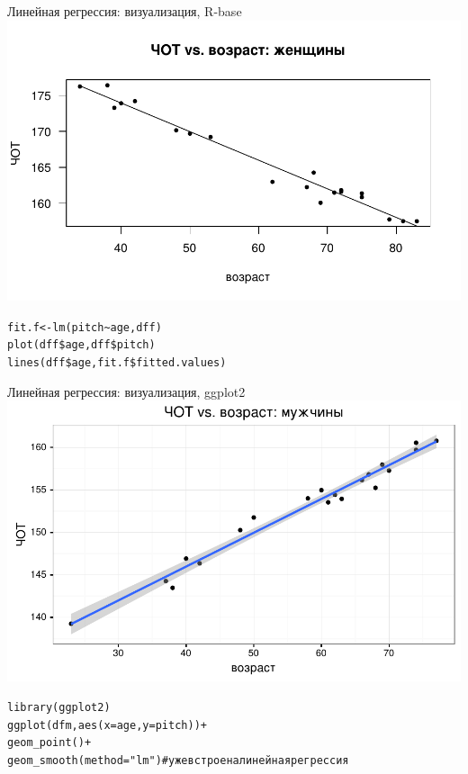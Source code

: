 \begin{frame}{Линейная регрессия: визуализация, R-base}
\includegraphics[width=\linewidth]{linearbaser.pdf}
\scriptsize
\begin{alltt}
fit.f <- lm(pitch\textasciitilde  age, dff)\\
plot(dff\$age, dff\$pitch)\\
lines(dff\$age, \alert{fit.f\$fitted.values})
\end{alltt}
\normalsize
\end{frame}
\begin{frame}{Линейная регрессия: визуализация, ggplot2}
\includegraphics[width=0.95\linewidth]{linearggplot.pdf}
\scriptsize
\begin{alltt}
library(ggplot2)\\
ggplot(dfm, aes(x=age, y = pitch))+\\
  geom\_point()+\\
\alert{geom\_smooth(method = "lm") \hfill \# уже встроена линейная регрессия}\\
\end{alltt}
\normalsize
\end{frame}
